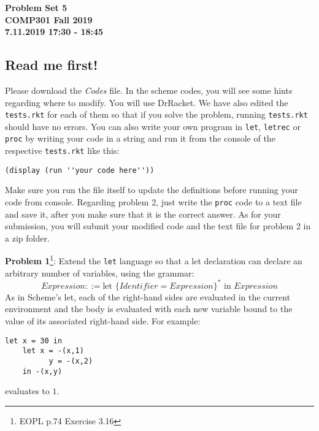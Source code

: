 \documentclass[12pt,reqno]{amsart}
\newcommand{\code}[1]{\texttt{#1}}
\begin{document}
\thispagestyle{empty}
\begin{center}
\large\textbf{Problem Set 5 \\ COMP301 Fall 2019} \\
\normalsize\textbf{7.11.2019 17:30 - 18:45} \\
\end{center}

\vspace{7.5mm}

\subsection*{Read me first!} Please download the \textit{Codes} file. In the scheme codes, you will see some hints regarding where to modify. You will use DrRacket. We have also edited the \code{tests.rkt} for each of them so that if you solve the problem, running \code{tests.rkt} should have no errors. You can also write your own program in \code{let}, \code{letrec} or \code{proc} by writing your code in a string and run it from the console of the respective \code{tests.rkt} like this:
\begin{lstlisting}
(display (run ''your code here''))
\end{lstlisting}
Make sure you run the file itself to update the definitions before running your code from console. Regarding problem 2, just write the \code{proc} code to a text file and save it, after you make sure that it is the correct answer. As for your submission, you will submit your modified code and the text file for problem 2 in a zip folder.

\vspace{7.5mm}

\textbf{Problem 1}\footnote{EOPL p.74 Exercise 3.16}: Extend the \code{let} language so that a let declaration can declare an arbitrary number of variables, using the grammar:
$$
Expression ::= \text{let } \{Identifier = Expression\}^* \text{ in } Expression
$$
As in Scheme’s let, each of the right-hand sides are evaluated in the current environment and the body is evaluated with each new variable bound to the value of its associated right-hand side. For example:
\begin{lstlisting}
let x = 30 in
    let x = -(x,1)
          y = -(x,2)
    in -(x,y)
\end{lstlisting}
evaluates to $1$.

\vspace{7.5mm}
\end{document}
